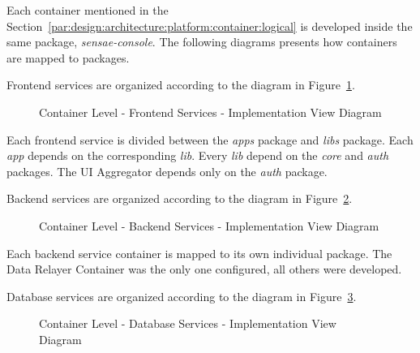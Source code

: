 Each container mentioned in the Section~\ref{par:design:architecture:platform:container:logical} is developed inside the same package, \textit{sensae-console}. The following diagrams presents how containers are mapped to packages.

Frontend services are organized according to the diagram in Figure~\ref{fig:design:architecture:platform:container:development:frontend}.

\begin{figure}[H]
   \centering
   \resizebox{\columnwidth}{!}
   {
      
   }
   \caption[Container Level - Frontend Services - Implementation View Diagram]{Container Level - Frontend Services - Implementation View Diagram}
   \label{fig:design:architecture:platform:container:development:frontend}
\end{figure}

Each frontend service is divided between the \textit{apps} package and \textit{libs} package. Each \textit{app} depends on the corresponding \textit{lib}. Every \textit{lib} depend on the \textit{core} and \textit{auth} packages. The UI Aggregator depends only on the \textit{auth} package.

Backend services are organized according to the diagram in Figure~\ref{fig:design:architecture:platform:container:development:backend}.

\begin{figure}[H]
   \centering
   \resizebox{\columnwidth}{!}
   {
      
   }
   \caption[Container Level - Backend Services - Implementation View Diagram]{Container Level - Backend Services - Implementation View Diagram}
   \label{fig:design:architecture:platform:container:development:backend}
\end{figure}

Each backend service container is mapped to its own individual package. The Data Relayer Container was the only one configured, all others were developed.

Database services are organized according to the diagram in Figure~\ref{fig:design:architecture:platform:container:development:database}.

\begin{figure}[H]
   \centering
   \resizebox{\columnwidth}{!}
   {
      
   }
   \caption[Container Level - Database Services - Implementation View Diagram]{Container Level - Database Services - Implementation View Diagram}
   \label{fig:design:architecture:platform:container:development:database}
\end{figure}

